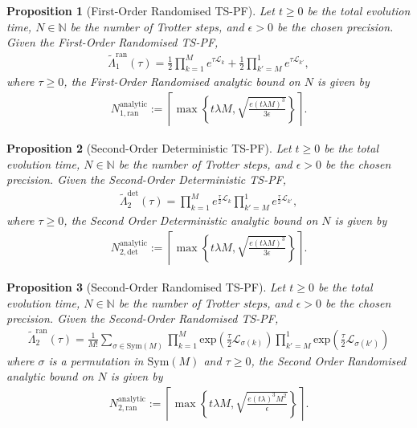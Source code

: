 \documentclass[pdflatex,sn-mathphys-num]{sn-jnl}%
\newtheorem{proposition}{Proposition}
\begin{document}
\begin{proposition}[First-Order Randomised TS-PF]
Let $t \geq 0$ be the total evolution time, $N \in \mathbb{N}$ be the number of Trotter steps, and $\epsilon > 0$ be the chosen precision. Given the First-Order Randomised TS-PF,
\begin{align}
\tilde{\Lambda}_{1}^{\text{ran}}(\tau) = \frac{1}{2}\prod_{k=1}^{M} e^{\tau \mathcal{L}_{k}}+\frac{1}{2}\prod_{k'=M}^{1} e^{\tau \mathcal{L}_{k'}},
\end{align}
where $\tau \geq 0$, the First-Order Randomised analytic bound on $N$ is given by
\begin{align}
N_{1,\text{ran}}^{\mathrm{analytic}} := \left\lceil \max \left\{ t \lambda M, \sqrt{\frac{e (t \lambda M)^{3}}{3\epsilon}} \right\} \right\rceil.
\end{align}
\end{proposition}

\begin{proposition}[Second-Order Deterministic TS-PF]
Let $t \geq 0$ be the total evolution time, $N \in \mathbb{N}$ be the number of Trotter steps, and $\epsilon > 0$ be the chosen precision. Given the Second-Order Deterministic TS-PF,
\begin{align}
\tilde{\Lambda}_{2}^{\text{det}}(\tau) = \prod_{k=1}^{M} e^{\frac{\tau}{2} \mathcal{L}_{k}}\prod_{k'=M}^{1} e^{\frac{\tau}{2} \mathcal{L}_{k'}},
\end{align}
where $\tau \geq 0$, the Second Order Deterministic analytic bound on $N$ is given by
\begin{align}
N_{2,\text{det}}^{\mathrm{analytic}} := \left\lceil \max \left\{ t \lambda M, \sqrt{\frac{e (t \lambda M)^{3}}{3\epsilon}} \right\} \right\rceil.
\end{align}
\end{proposition}

\begin{proposition}[Second-Order Randomised TS-PF]
Let $t \geq 0$ be the total evolution time, $N \in \mathbb{N}$ be the number of Trotter steps, and $\epsilon > 0$ be the chosen precision. Given the Second-Order Randomised TS-PF,
\begin{align}
\tilde{\Lambda}_2^{\mathrm{ran}}(\tau) = \frac{1}{M!} \sum_{\sigma \in \mathrm{Sym}(M)}\prod_{k=1}^M \mathrm{exp}(\frac{\tau}{2}\mathcal{L}_{\sigma(k)}) \prod_{k'=M}^1 \mathrm{exp}(\frac{\tau}{2}\mathcal{L}_{\sigma(k')})
\end{align}
where $\sigma$ is a permutation in $\mathrm{Sym}(M)$ and $\tau \geq 0$, the Second Order Randomised analytic bound on $N$ is given by
\begin{align}
N_{2,\text{ran}}^{\mathrm{analytic}} := \left\lceil \max \left\{ t \lambda M, \sqrt{\frac{e (t \lambda)^{3}M^{2}}{\epsilon}} \right\} \right\rceil.
\end{align}
\end{proposition}
\end{document}
